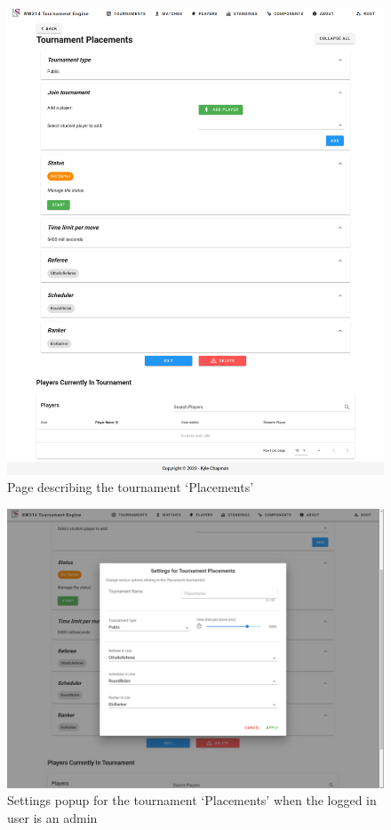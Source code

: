 \documentclass[a4paper, 12pt]{report}
\begin{document}
\begin{figure}[H]
	\centering
	\includegraphics[scale=0.37]{tournaments-admin.png}
	\caption{Page describing the tournament `Placements'}
	\label{fig:tourn-placements}
\end{figure}
\begin{figure}[H]
	\centering
	\includegraphics[scale=0.33]{settings-admin.png}
	\caption{Settings popup for the tournament `Placements' when the logged in user is an admin}
	\label{fig:settings-admin}
\end{figure}
\end{document}
